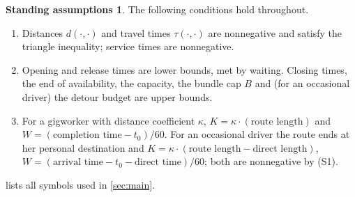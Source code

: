 \documentclass[11pt]{article}
\theoremstyle{definition}
\newtheorem*{standing}{Standing assumptions}
\theoremstyle{remark}
\begin{document}
\begin{standing}
The following conditions hold throughout.
\begin{enumerate}[label=(S\arabic*), leftmargin=2.6em, itemsep=1pt]
\item Distances $d(\cdot,\cdot)$ and travel times $\tau(\cdot,\cdot)$ are
nonnegative and satisfy the triangle inequality; service times are nonnegative.
\item Opening and release times are lower bounds, met by waiting. Closing
times, the end of availability, the capacity, the bundle cap $B$ and (for an
occasional driver) the detour budget are upper bounds.
\item For a gigworker with distance coefficient $\kappa$,
$K=\kappa\cdot(\text{route length})$ and $W=(\text{completion time}-t_0)/60$.
For an occasional driver the route ends at her personal destination and
$K=\kappa\cdot(\text{route length}-\text{direct length})$,
$W=(\text{arrival time}-t_0-\text{direct time})/60$; both are nonnegative by
(S1).
\end{enumerate}
\end{standing}

 lists all symbols used in \cref{sec:main}.
\end{document}
